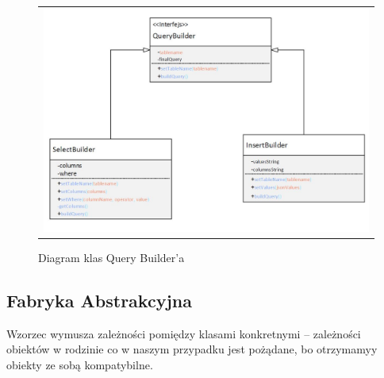 \documentclass{sprawozdanie-agh}
\begin{document}
	\begin{figure}[H] 
		\centering
		\begin{tabular}{c}
			\includegraphics[width=.99\textwidth]{querybuilder}
		\end{tabular} 
		\caption{Diagram klas Query Builder'a}
	\end{figure}
	
	\subsection{Fabryka Abstrakcyjna}
	
	Wzorzec wymusza zależności pomiędzy	klasami konkretnymi – zależności obiektów w rodzinie co w naszym przypadku jest pożądane, bo otrzymamyy obiekty ze sobą kompatybilne.
	
\end{document}

